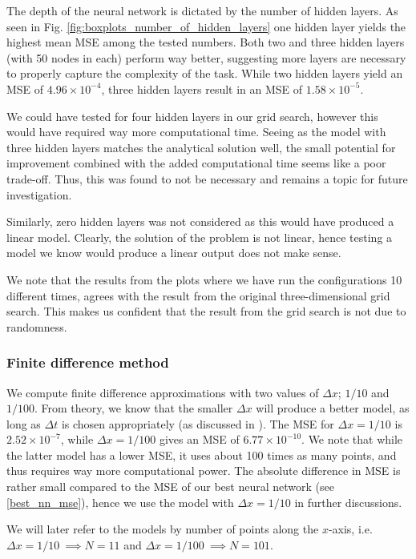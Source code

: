 The depth of the neural network is dictated by the number of hidden layers.
As seen in Fig. \ref{fig:boxplots_number_of_hidden_layers} one hidden layer yields the highest mean MSE among the tested numbers. 
Both two and three hidden layers (with 50 nodes in each) perform way better, suggesting more layers are necessary to properly capture the complexity of the task. 
While two hidden layers yield an MSE of $4.96 \times 10^{-4}$, three hidden layers result in an MSE of $1.58 \times 10^{-5}$.

We could have tested for four hidden layers in our grid search, however this would have required way more computational time.
Seeing as the model with three hidden layers matches the analytical solution well, the small potential for improvement combined with the added computational time seems like a poor trade-off. 
Thus, this was found to not be necessary and remains a topic for future investigation.

Similarly, zero hidden layers was not considered as this would have produced a linear model.
Clearly, the solution of the problem is not linear, hence testing a model we know would produce a linear output does not make sense.

We note that the results from the plots where we have run the configurations 10 different times, agrees with the result from the original three-dimensional grid search.
This makes us confident that the result from the grid search is not due to randomness.

\subsubsection{Finite difference method}

We compute finite difference approximations with two values of $\Delta x$; $1/10$ and $1/100$.
From theory, we know that the smaller $\Delta x$ will produce a better model, as long as $\Delta t$ is chosen appropriately (as discussed in ).
The MSE for $\Delta x = 1/10$ is $2.52\times 10^{-7}$, while $\Delta x = 1/100$ gives an MSE of $6.77\times 10^{-10}$.
We note that while the latter model has a lower MSE, it uses about 100 times as many points, and thus requires way more computational power.
The absolute difference in MSE is rather small compared to the MSE of our best neural network (see \ref{best_nn_mse}), hence we use the model with $\Delta x = 1/10$ in further discussions.

We will later refer to the models by number of points along the $x$-axis, i.e. $\Delta x = 1/10 \ \implies N = 11$ and $\Delta x = 1/100 \ \implies N = 101$.

